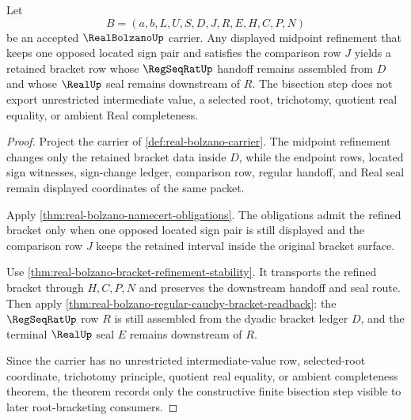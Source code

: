 \begin{theorem}
\label{thm:real-bolzano-sign-change-bisection}
Let
$$
B=(a,b,L,U,S,D,J,R,E,H,C,P,N)
$$
be an accepted $\RealBolzanoUp$ carrier. Any displayed midpoint refinement that keeps one opposed located sign pair and satisfies the comparison row $J$ yields a retained bracket row whose $\RegSeqRatUp$ handoff remains assembled from $D$ and whose $\RealUp$ seal remains downstream of $R$. The bisection step does not export unrestricted intermediate value, a selected root, trichotomy, quotient real equality, or ambient Real completeness.
\end{theorem}
\begin{proof}
Project the carrier of \autoref{def:real-bolzano-carrier}. The midpoint refinement changes only the retained bracket data inside $D$, while the endpoint rows, located sign witnesses, sign-change ledger, comparison row, regular handoff, and Real seal remain displayed coordinates of the same packet.

Apply \autoref{thm:real-bolzano-namecert-obligations}. The obligations admit the refined bracket only when one opposed located sign pair is still displayed and the comparison row $J$ keeps the retained interval inside the original bracket surface.

Use \autoref{thm:real-bolzano-bracket-refinement-stability}. It transports the refined bracket through $H,C,P,N$ and preserves the downstream handoff and seal route. Then apply \autoref{thm:real-bolzano-regular-cauchy-bracket-readback}: the $\RegSeqRatUp$ row $R$ is still assembled from the dyadic bracket ledger $D$, and the terminal $\RealUp$ seal $E$ remains downstream of $R$.

Since the carrier has no unrestricted intermediate-value row, selected-root coordinate, trichotomy principle, quotient real equality, or ambient completeness theorem, the theorem records only the constructive finite bisection step visible to later root-bracketing consumers.
\end{proof}

